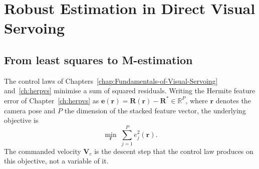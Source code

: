 %
%

\section{Robust Estimation in Direct Visual Servoing}
\label{sec:robust-framework}

\subsection{From least squares to M-estimation}
\label{sec:least-squares}

The control laws of Chapters~\ref{chap:Fundamentals-of-Visual-Servoing}
and~\ref{ch:herpvs} minimise a sum of squared residuals. Writing the Hermite
feature error of Chapter~\ref{ch:herpvs} as
$\mathbf{e}(\mathbf{r})=\mathbf{R}(\mathbf{r})-\mathbf{R}^{*}\in\mathbb{R}^{P}$,
where $\mathbf{r}$ denotes the camera pose and $P$ the dimension of the stacked
feature vector, the underlying objective is
\begin{equation}
    \min_{\mathbf{r}}\;\sum_{j=1}^{P} e_{j}^{2}(\mathbf{r}).
    \label{eq:ls-objective}
\end{equation}
The commanded velocity $\mathbf{V}_{c}$ is the descent step that the control
law produces on this objective, not a variable of it.

